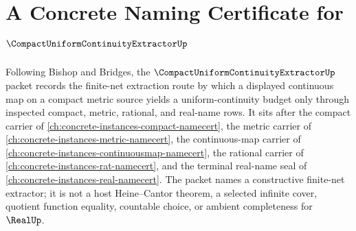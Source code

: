 \chapter{A Concrete Naming Certificate for $\CompactUniformContinuityExtractorUp$}
\label{ch:concrete-instances-compact-uniform-continuity-extractor-namecert}

Following Bishop and Bridges, the $\CompactUniformContinuityExtractorUp$ packet records the finite-net extraction route by which a displayed continuous map on a compact metric source yields a uniform-continuity budget only through inspected compact, metric, rational, and real-name rows. It sits after the compact carrier of \autoref{ch:concrete-instances-compact-namecert}, the metric carrier of \autoref{ch:concrete-instances-metric-namecert}, the continuous-map carrier of \autoref{ch:concrete-instances-continuousmap-namecert}, the rational carrier of \autoref{ch:concrete-instances-rat-namecert}, and the terminal real-name seal of \autoref{ch:concrete-instances-real-namecert}. The packet names a constructive finite-net extractor; it is not a host Heine--Cantor theorem, a selected infinite cover, quotient function equality, countable choice, or ambient completeness for $\RealUp$.

